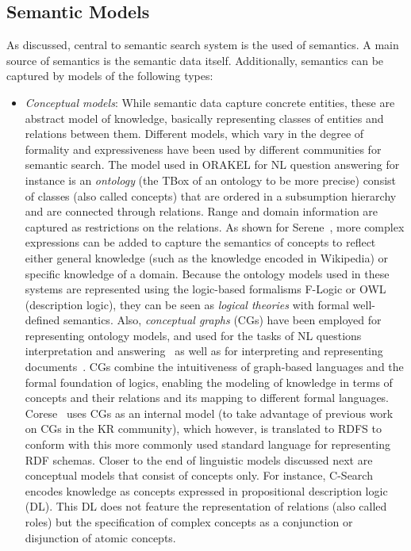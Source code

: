 \subsection{Semantic Models}
As discussed, central to semantic search system is the used of semantics. A main source of semantics is the semantic data itself. Additionally, semantics can be captured by models of the following types:

\begin{itemize}
	\item \emph{Conceptual models}: While semantic data capture concrete entities, these are abstract model of knowledge, basically representing classes of entities and relations between them. Different models, which vary in the degree of formality and expressiveness have been used by different communities for semantic search. The model used in ORAKEL for NL question answering for instance is an \emph{ontology} (the TBox of an ontology to be more precise) consist of classes (also called concepts) that are ordered in a subsumption hierarchy and are connected through relations. Range and domain information are captured as restrictions on the relations. As shown for Serene~\cite{DBLP:journals/ws/FazzingaGGL11}, more complex expressions can be added to capture the semantics of concepts to reflect either general knowledge (such as the knowledge encoded in Wikipedia)
or specific knowledge of a domain. Because the ontology models used in these systems are represented using the logic-based formalisms F-Logic or OWL (description logic), they can be seen as \emph{logical theories} with formal well-defined semantics. Also, \emph{conceptual graphs} (CGs) have been employed for representing ontology models, and used for the tasks of NL questions interpretation and answering~\cite{DBLP:conf/aswc/CaoCT08} as well as for interpreting and representing documents~\cite{DBLP:conf/iccs/ComparotHH07}. CGs combine the intuitiveness of graph-based languages and the formal foundation of logics, enabling the modeling of knowledge in terms of concepts and their relations and its mapping to different formal languages. Corese~\cite{DBLP:conf/ecai/CorbyDF04} uses CGs as an internal model (to take advantage of previous work on CGs in the KR community), which however, is translated to RDFS to conform with this more commonly used standard language for representing RDF schemas. Closer to the end of linguistic models discussed next are conceptual models that consist of concepts only. For instance, C-Search encodes knowledge as concepts expressed in propositional description logic (DL). This DL does not feature the representation of relations (also called roles) but the specification of complex concepts as a conjunction or disjunction of atomic concepts. 


\end{itemize}
